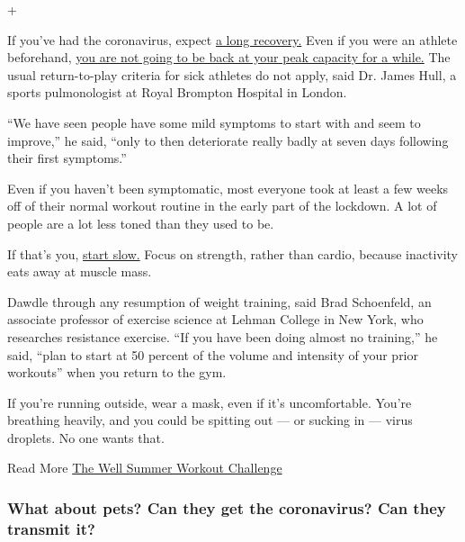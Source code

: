 +

If you've had the coronavirus, expect
\href{https://www.nytimes3xbfgragh.onion/2020/05/06/opinion/coronavirus-recovery.html}{a
long recovery.} Even if you were an athlete beforehand,
\href{https://www.nytimes3xbfgragh.onion/2020/05/20/well/returning-to-exercise-training-recovery-coronavirus.html}{you
are not going to be back at your peak capacity for a while.} The usual
return-to-play criteria for sick athletes do not apply, said Dr. James
Hull, a sports pulmonologist at Royal Brompton Hospital in London.

``We have seen people have some mild symptoms to start with and seem to
improve,'' he said, ``only to then deteriorate really badly at seven
days following their first symptoms.''

Even if you haven't been symptomatic, most everyone took at least a few
weeks off of their normal workout routine in the early part of the
lockdown. A lot of people are a lot less toned than they used to be.

If that's you,
\href{https://www.nytimes3xbfgragh.onion/2020/06/01/well/move/coronavirus-exercise-lockdown-quarantine-sports-weights-running-injuries.html}{start
slow.} Focus on strength, rather than cardio, because inactivity eats
away at muscle mass.

Dawdle through any resumption of weight training, said Brad Schoenfeld,
an associate professor of exercise science at Lehman College in New
York, who researches resistance exercise. ``If you have been doing
almost no training,'' he said, ``plan to start at 50 percent of the
volume and intensity of your prior workouts'' when you return to the
gym.

If you're running outside, wear a mask, even if it's uncomfortable.
You're breathing heavily, and you could be spitting out --- or sucking
in --- virus droplets. No one wants that.

Read More
\href{https://www.nytimes3xbfgragh.onion/2020/07/02/well/move/the-well-summer-workout-challenge.html}{The
Well Summer Workout Challenge}

\hypertarget{what-about-pets-can-they-get-the-coronavirus-can-they-transmit-it}{%
\subsubsection{What about pets? Can they get the coronavirus? Can they
transmit
it?}\label{what-about-pets-can-they-get-the-coronavirus-can-they-transmit-it}}

